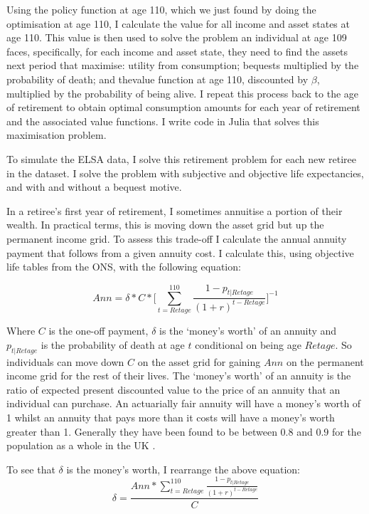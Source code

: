 \documentclass[12pt]{article}
\begin{document}
Using the policy function at age 110, which we just found by doing the
optimisation at age 110, I calculate the value for all income and asset states
at age 110. This value is then used to solve the problem an individual at age
109 faces, specifically, for each income and asset state, they need to find the
assets next period that maximise: utility from consumption; bequests multiplied
by the probability of death; and thevalue function at age 110, discounted by
$\beta$, multiplied by the probability of being alive. I repeat this process
back to the age of retirement to obtain optimal consumption amounts for each
year of retirement and the associated value functions. I write code in Julia
that solves this maximisation problem.

To simulate the ELSA data, I solve this retirement problem for each new retiree
in the dataset. I solve the problem with subjective and objective life
expectancies, and with and without a bequest motive.

In a retiree's first year of retirement, I sometimes annuitise a portion of
their wealth. In practical terms, this is moving down the asset grid but up the
permanent income grid. To assess this trade-off I calculate the annual annuity
payment that follows from a given annuity cost. I calculate this, using
objective life tables from the ONS, with the following equation:


\begin{equation*}
    Ann = \delta * C * \biggl[\sum_{t = Retage}^{110}\frac{1 - p_{t|Retage}}{(1 + r)^{t - Retage}}\biggr]^{-1}
\end{equation*}

Where $C$ is the one-off payment, $\delta$ is the `money's worth' of an annuity
and $p_{t|Retage}$ is the probability of death at age $t$ conditional on being
age $Retage$. So individuals can move down $C$ on the asset grid for gaining
$Ann$ on the permanent income grid for the rest of their lives. The `money's
worth' of an annuity is the ratio of expected present discounted value to the
price of an annuity that an individual can purchase. An actuarially fair annuity
will have a money's worth of 1 whilst an annuity that pays more than it costs
will have a money's worth greater than 1. Generally they have been found to be
between $0.8$ and $0.9$ for the population as a whole in the UK
\citep{finkelstein_porteba_2002, finkelstein_porteba_2004, mitchell_et_al_1999}.

To see that $\delta$ is the money's worth, I rearrange the above equation:
\begin{equation*}
    \delta =  \frac{Ann*\sum_{t = Retage}^{110}\frac{1 - p_{t|Retage}}{(1 + r)^{t - Retage}}}{C}
\end{equation*}
\end{document}
